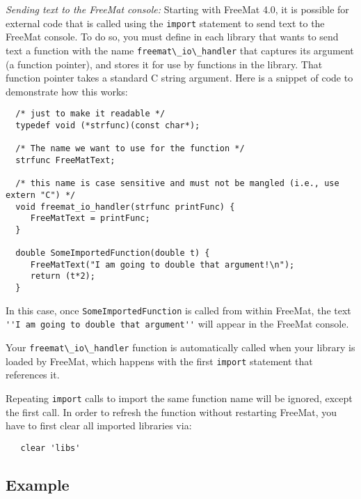 \emph{Sending text to the FreeMat console:}
Starting with FreeMat 4.0, it is possible for external code that is 
called using the \verb|import| statement to send text to the FreeMat console.
To do so, you must define in each library that wants to send text a 
function with the name \verb|freemat\_io\_handler| that captures its 
argument (a function pointer), and stores it
for use by functions in the library.  That function pointer takes a 
standard C string argument.  Here is a snippet of code to demonstrate
how this works:
\begin{verbatim}
  /* just to make it readable */
  typedef void (*strfunc)(const char*); 

  /* The name we want to use for the function */
  strfunc FreeMatText;                  

  /* this name is case sensitive and must not be mangled (i.e., use extern "C") */
  void freemat_io_handler(strfunc printFunc) {
     FreeMatText = printFunc;
  }

  double SomeImportedFunction(double t) {
     FreeMatText("I am going to double that argument!\n");
     return (t*2);
  }
\end{verbatim}
In this case, once \verb|SomeImportedFunction| is called from within FreeMat, the
text \verb|''I am going to double that argument''| will appear in the FreeMat console.

Your \verb|freemat\_io\_handler| function is automatically called when your library is
loaded by FreeMat, which happens with the first \verb|import| statement that references
it.

Repeating \verb|import| calls to import the same function name will be ignored, except
the first call. In order to refresh the function without restarting FreeMat,
you have to first clear all imported libraries via:
\begin{verbatim}
   clear 'libs'
\end{verbatim}

\subsection{Example}

